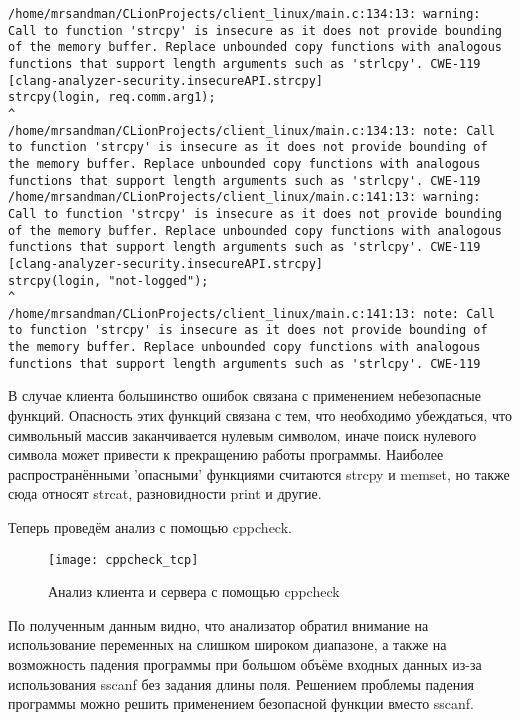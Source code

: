 \begin{itemize}
\begin{lstlisting}
/home/mrsandman/CLionProjects/client_linux/main.c:134:13: warning: Call to function 'strcpy' is insecure as it does not provide bounding of the memory buffer. Replace unbounded copy functions with analogous functions that support length arguments such as 'strlcpy'. CWE-119 [clang-analyzer-security.insecureAPI.strcpy]
strcpy(login, req.comm.arg1);
^
/home/mrsandman/CLionProjects/client_linux/main.c:134:13: note: Call to function 'strcpy' is insecure as it does not provide bounding of the memory buffer. Replace unbounded copy functions with analogous functions that support length arguments such as 'strlcpy'. CWE-119
/home/mrsandman/CLionProjects/client_linux/main.c:141:13: warning: Call to function 'strcpy' is insecure as it does not provide bounding of the memory buffer. Replace unbounded copy functions with analogous functions that support length arguments such as 'strlcpy'. CWE-119 [clang-analyzer-security.insecureAPI.strcpy]
strcpy(login, "not-logged");
^
/home/mrsandman/CLionProjects/client_linux/main.c:141:13: note: Call to function 'strcpy' is insecure as it does not provide bounding of the memory buffer. Replace unbounded copy functions with analogous functions that support length arguments such as 'strlcpy'. CWE-119
\end{lstlisting}

В случае клиента большинство ошибок связана с применением небезопасные функций. Опасность этих функций связана с тем, что необходимо убеждаться, что символьный массив заканчивается нулевым символом, иначе поиск нулевого символа может привести к прекращению работы программы. Наиболее распространёнными 'опасными' функциями считаются strcpy и memset, но также сюда относят strcat, разновидности print и другие.

Теперь проведём анализ с помощью cppcheck.

\begin{figure}[H]
	\begin{center}
		\texttt{[image: cppcheck\_tcp]}
		\caption{Анализ клиента и сервера с помощью cppcheck} 
		\label{pic:cppcheck_tcp.png} %
	\end{center}
\end{figure}

По полученным данным видно, что анализатор обратил внимание на использование переменных на слишком широком диапазоне, а также на возможность падения программы при большом объёме входных данных из-за использования sscanf без задания длины поля. Решением проблемы падения программы можно решить применением безопасной функции вместо sscanf.


\end{itemize}
